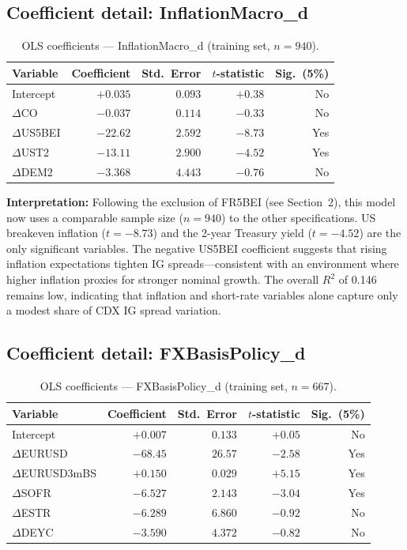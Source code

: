 \subsection*{Coefficient detail: InflationMacro\_d}

\begin{table}[H]
\centering
\small
\caption{OLS coefficients --- InflationMacro\_d (training set, \(n = 940\)).}
\label{tab:coef_im}
\begin{tabular}{lrrrr}
\toprule
Variable & Coefficient & Std.\ Error & \(t\)-statistic & Sig.\ (5\%) \\
\midrule
Intercept         & $+0.035$ & $0.093$ & $+0.38$ & No  \\
\(\Delta\)CO      & $-0.037$ & $0.114$ & $-0.33$ & No  \\
\(\Delta\)US5BEI  & $-22.62$ & $2.592$ & $-8.73$ & Yes \\
\(\Delta\)UST2    & $-13.11$ & $2.900$ & $-4.52$ & Yes \\
\(\Delta\)DEM2    & $-3.368$ & $4.443$ & $-0.76$ & No  \\
\bottomrule
\end{tabular}
\end{table}

\textbf{Interpretation:}
Following the exclusion of FR5BEI (see Section~2), this model now uses a
comparable sample size (\(n = 940\)) to the other specifications.
US breakeven inflation (\(t = -8.73\)) and the 2-year Treasury yield
(\(t = -4.52\)) are the only significant variables. The negative US5BEI
coefficient suggests that rising inflation expectations tighten IG
spreads---consistent with an environment where higher inflation proxies for
stronger nominal growth. The overall \(R^2\) of 0.146 remains low, indicating
that inflation and short-rate variables alone capture only a modest share of
CDX IG spread variation.

\subsection*{Coefficient detail: FXBasisPolicy\_d}

\begin{table}[H]
\centering
\small
\caption{OLS coefficients --- FXBasisPolicy\_d (training set, \(n = 667\)).}
\label{tab:coef_fbp}
\begin{tabular}{lrrrr}
\toprule
Variable & Coefficient & Std.\ Error & \(t\)-statistic & Sig.\ (5\%) \\
\midrule
Intercept             & $+0.007$ & $0.133$ & $+0.05$ & No  \\
\(\Delta\)EURUSD      & $-68.45$ & $26.57$ & $-2.58$ & Yes \\
\(\Delta\)EURUSD3mBS  & $+0.150$ & $0.029$ & $+5.15$ & Yes \\
\(\Delta\)SOFR        & $-6.527$ & $2.143$ & $-3.04$ & Yes \\
\(\Delta\)ESTR        & $-6.289$ & $6.860$ & $-0.92$ & No  \\
\(\Delta\)DEYC        & $-3.590$ & $4.372$ & $-0.82$ & No  \\
\bottomrule
\end{tabular}
\end{table}

